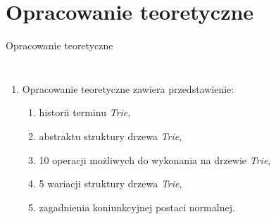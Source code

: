 \documentclass[aspectratio=1610,english]{beamer} %
\begin{document}
  	\section{Opracowanie teoretyczne}
	\begin{frame}{Opracowanie teoretyczne}{}
	    \begin{columns}
	        \hspace*{-0.75cm}
        	    \begin{enumerate}
        	        \item Opracowanie teoretyczne zawiera przedstawienie:
        	        \begin{enumerate}
            	        \item {\color{AGH@green}historii terminu} \emph{Trie},
            	        \item {\color{AGH@green}abstraktu struktury} drzewa \emph{Trie},
            	        \item {\color{AGH@green}10 operacji} możliwych do wykonania na drzewie \emph{Trie},
            	        \item {\color{AGH@green}5 wariacji} struktury {\color{AGH@green}drzewa} \emph{Trie},
            	        \item zagadnienia {\color{AGH@green}koniunkcyjnej postaci normalnej}.
        	        \end{enumerate}
        	        

\end{enumerate}
\end{columns}
\end{frame}
\end{document}
